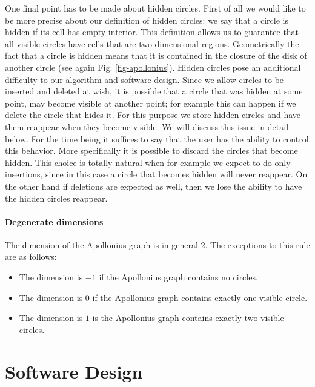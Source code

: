 One final point has to be made about hidden circles. First of all we
would like to be more precise about our definition of hidden circles:
we say that a circle is hidden if its cell has empty interior. This
definition allows us to guarantee that all visible circles have
cells that are two-dimensional regions.
Geometrically the fact that a circle is hidden means that it is
contained in the closure of the disk of another circle (see again
Fig. \ref{fig-apollonius}). Hidden circles pose an additional
difficulty to our algorithm and software design. Since we allow
circles to be inserted and deleted at wish, it is possible that a
circle that was hidden at some point, may become visible at another
point; for example this can happen if we delete the circle that
hides it. For this purpose we store hidden circles and have them
reappear when they become visible. We will discuss this issue in
detail below. For the time being it suffices to say that the user has
the ability to control this behavior. More specifically it is possible
to discard the circles that become hidden. This choice is totally
natural when for example we expect to do only insertions, since in
this case a circle that becomes hidden will never reappear. On the
other hand if deletions are expected as well, then we lose the ability
to have the hidden circles reappear.

\paragraph{Degenerate dimensions}
The dimension of the Apollonius graph is in general 2. The exceptions
to this rule are as follows:
\begin{itemize}
\item The dimension is $-1$ if the Apollonius graph contains no circles.
\item The dimension is $0$ if the Apollonius graph contains exactly
  one visible circle.
\item The dimension is $1$ is the Apollonius graph contains exactly
  two visible circles.
\end{itemize}


\section{Software Design}
\label{sec:apollonius2-design}

